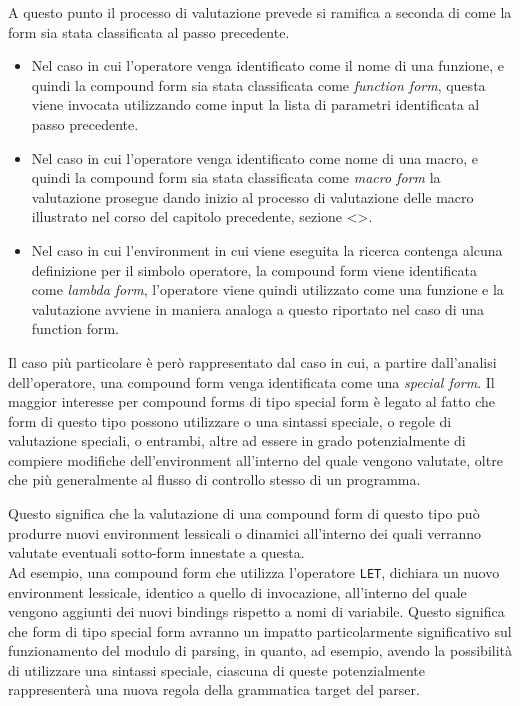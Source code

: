 A questo punto il processo di valutazione prevede si ramifica a seconda di
come la form sia stata classificata al passo precedente.

\begin{itemize}

\item Nel caso in cui l’operatore venga identificato come il nome di una
funzione, e quindi la compound form sia stata classificata come
\textit{function form}, questa viene invocata utilizzando come input la lista
di parametri identificata al passo precedente.

\item Nel caso in cui l’operatore venga identificato come nome di una macro, e
quindi la compound form sia stata classificata come \textit{macro form} la
valutazione prosegue dando inizio al processo di valutazione delle macro
illustrato nel corso del capitolo precedente, sezione <>.

\item Nel caso in cui l’environment in cui viene eseguita la ricerca contenga
alcuna definizione per il simbolo operatore, la compound form viene
identificata come \textit{lambda form}, l’operatore viene quindi utilizzato
come una funzione e la valutazione avviene in maniera analoga a questo
riportato nel caso di una function form.

\end{itemize}

Il caso più particolare è però rappresentato dal caso in cui, a partire
dall’analisi dell’operatore, una compound form venga identificata come una
\textit{special form}. Il maggior interesse per compound forms di tipo special
form è legato al fatto che form di questo tipo possono utilizzare o una
sintassi speciale, o regole di valutazione speciali, o entrambi, altre ad
essere in grado potenzialmente di compiere modifiche dell’environment
all’interno del quale vengono valutate, oltre che più generalmente al flusso
di controllo stesso di un programma.

Questo significa che la valutazione di una compound form di questo tipo può
produrre nuovi environment lessicali o dinamici all’interno dei quali verranno
valutate eventuali sotto-form innestate a questa.\\

Ad esempio, una compound form che utilizza l’operatore \texttt{LET}, dichiara
un nuovo environment lessicale, identico a quello di invocazione, all’interno
del quale vengono aggiunti dei nuovi bindings rispetto a nomi di variabile.
Questo significa che form di tipo special form avranno un impatto
particolarmente significativo sul funzionamento del modulo di parsing, in
quanto, ad esempio, avendo la possibilità di utilizzare una sintassi speciale,
ciascuna di queste potenzialmente rappresenterà una nuova regola della
grammatica target del parser.\\


